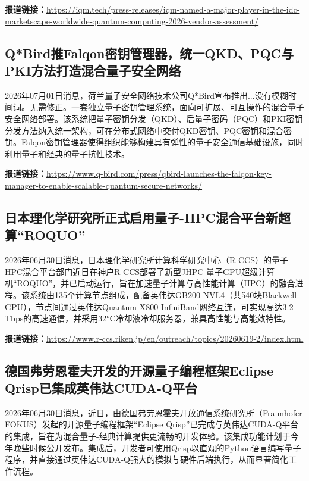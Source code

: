 \documentclass[12pt,a4paper]{ctexart}
\begin{document}
\noindent\textbf{报道链接：}\url{https://iqm.tech/press-releases/iqm-named-a-major-player-in-the-idc-marketscape-worldwide-quantum-computing-2026-vendor-assessment/}

\subsection{ Q*Bird推Falqon密钥管理器，统一QKD、PQC与PKI方法打造混合量子安全网络 }

2026年07月01日消息，荷兰量子安全网络技术公司Q*Bird宣布推出...没有模糊时间词。无需修正。一套独立量子密钥管理系统，面向可扩展、可互操作的混合量子安全网络部署。该系统把量子密钥分发（QKD）、后量子密码（PQC）和PKI密钥分发方法纳入统一架构，可在分布式网络中交付QKD密钥、PQC密钥和混合密钥。Falqon密钥管理器使得组织能够构建具有弹性的量子安全通信基础设施，同时利用量子和经典的量子抗性技术。

\noindent\textbf{报道链接：}\url{https://www.q-bird.com/press/qbird-launches-the-falqon-key-manager-to-enable-scalable-quantum-secure-networks/}

\subsection{ 日本理化学研究所正式启用量子-HPC混合平台新超算“ROQUO” }

2026年06月30日消息，日本理化学研究所计算科学研究中心（R-CCS）的量子-HPC混合平台部门近日在神户R-CCS部署了新型JHPC-量子GPU超级计算机“ROQUO”，并已启动运行，旨在加速量子计算与高性能计算（HPC）的融合进程。该系统由135个计算节点组成，配备英伟达GB200 NVL4（共540块Blackwell GPU），节点间通过英伟达Quantum-X800 InfiniBand网络互连，可实现高达3.2 Tbps的高速通信，并采用32°C冷却液冷却服务器，兼具高性能与高能效特性。

\noindent\textbf{报道链接：}\url{https://www.r-ccs.riken.jp/en/outreach/topics/20260619-2/index.html}

\subsection{ 德国弗劳恩霍夫开发的开源量子编程框架Eclipse Qrisp已集成英伟达CUDA-Q平台 }

2026年06月30日消息，近日，由德国弗劳恩霍夫开放通信系统研究所（Fraunhofer FOKUS）发起的开源量子编程框架“Eclipse Qrisp”已完成与英伟达CUDA-Q平台的集成，旨在为混合量子-经典计算提供更流畅的开发体验。该集成功能计划于今年晚些时候公开发布。集成后，开发者可使用Qrisp以直观的Python语言编写量子程序，并直接通过英伟达CUDA-Q强大的模拟与硬件后端执行，从而显著简化工作流程。
\end{document}
